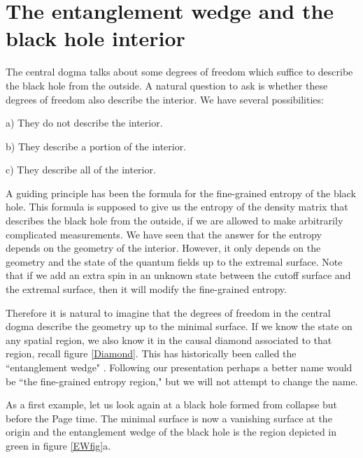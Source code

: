 


\section{The entanglement wedge and the black hole interior} \label{wedge}


 
 The central dogma talks about some degrees of freedom which suffice to describe the black hole from the outside. A natural question to ask is whether these degrees of freedom also describe the interior.   We have several possibilities: 
 
 a) They do not describe the interior. 
 
 b) They describe a portion of the interior. 
 
 c) They describe all of the interior. 
 
A guiding principle has been the formula for the fine-grained entropy of the black hole. This formula is supposed to give us the entropy of the density matrix that describes the black hole from the outside, if we are allowed to make arbitrarily complicated measurements. 
 We have seen that the answer for the entropy depends on the geometry of the interior. However, it only depends on the geometry and the state of the quantum fields up to the extremal   surface. Note that if we add an extra spin in an unknown state between the cutoff surface and the extremal  surface, then it will modify the fine-grained entropy. 
 
 Therefore it is natural to imagine that the degrees of freedom in the central dogma describe the geometry up to the minimal surface. If we know the state on any spatial region, we also know it in the causal diamond associated to that region, recall figure \ref{Diamond}. This has historically been called the ``entanglement wedge" \cite{Czech:2012bh,Wall:2012uf,Headrick:2014cta}. Following our presentation perhaps a better name would be ``the fine-grained entropy region," but we will not attempt to change the name. 

As a first example, let us look again at a black hole formed from collapse but before the Page time. The minimal surface is now a vanishing surface at the origin and the entanglement wedge of the black hole is the region depicted in green in figure  \ref{EWfig}a.   

